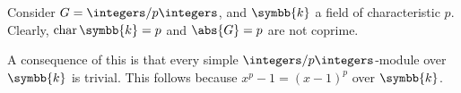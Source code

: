 \documentclass[fleqn]{NotesClass}
\renewcommand{\field}{\symbb{k}}
\DeclareMathOperator{\Char}{char}
\begin{document}
    \begin{exm}{}{}
        Consider \(G = \integers/p\integers\), and \(\field\) a field of characteristic \(p\).
        Clearly, \(\Char \field = p\) and \(\abs{G} = p\) are not coprime.
        
        A consequence of this is that every simple \(\integers/p\integers\)-module over \(\field\) is trivial.
        This follows because \(x^p - 1 = (x - 1)^p\) over \(\field\).
    \end{exm}
    
    
%	

    \backmatter
    \renewcommand{\glossaryname}{Acronyms}
    \printglossary[acronym]
    \printindex
\end{document}
